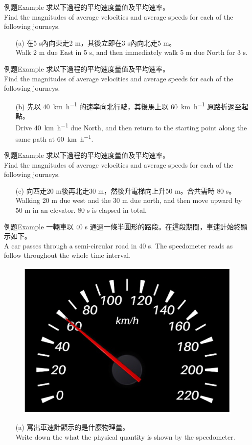 \documentclass[beamer=true]{standalone}
\begin{document}
\begin{frame}[t]{例題Example}
    求以下過程的平均速度量值及平均速率。 \\Find the magnitudes of average velocities and average speeds for each of the following journeys.
    \begin{itemize}
        \item [(a)]在5 s內向東走2 m，其後立即在3 s內向北走5 m。 \\Walk 2 m due East in 5 s, and then immediately walk 5 m due North for 3 s.
    \end{itemize}
\end{frame}
\begin{frame}[t]{例題Example}
    求以下過程的平均速度量值及平均速率。 \\Find the magnitudes of average velocities and average speeds for each of the following journeys.
    \begin{itemize}
        \item [(b)]先以 \qty{40}{km.h^{-1}} 的速率向北行駛，其後馬上以 \qty{60}{km.h^{-1}} 原路折返至起點。 \\Drive \qty{40}{km.h^{-1}} due North, and then return to the starting point along the same path at \qty{60}{km.h^{-1}}.
    \end{itemize}
\end{frame}
\begin{frame}[t]{例題Example}
    求以下過程的平均速度量值及平均速率。 \\Find the magnitudes of average velocities and average speeds for each of the following journeys.
    \begin{itemize}
        \item [(c)]向西走20 m後再北走30 m，然後升電梯向上升50 m。合共需時 80 s。 \\Walking 20 m due west and the 30 m due north, and then move upward by 50 m in an elevator. 80 s is elapsed in total.
    \end{itemize}
\end{frame}
\begin{frame}[t]{例題Example}
    一輛車以 40 s 通過一條半圓形的路段。在這段期間，車速計始終顯示如下。\\ A car passes through a semi-circular road in 40 s. The speedometer reads as follow throughout the whole time interval.
    \begin{figure}[h!]
        \centering
        \includegraphics[width=.35\textwidth]{../../assets/fca35903.png}
    \end{figure}
    \begin{itemize}
        \item [(a)]寫出車速計顯示的是什麼物理量。 \\Write down the what the physical quantity is shown by the speedometer.
    \end{itemize}
\end{frame}
\end{document}
